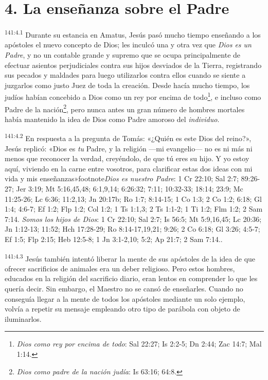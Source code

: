 \section*{4. La enseñanza sobre el Padre}
\par 
\textsuperscript{141:4.1} Durante su estancia en Amatus, Jesús pasó mucho tiempo enseñando a los apóstoles el nuevo concepto de Dios; les inculcó una y otra vez que \textit{Dios es un Padre}, y no un contable grande y supremo que se ocupa principalmente de efectuar asientos perjudiciales contra sus hijos desviados de la Tierra, registrando sus pecados y maldades para luego utilizarlos contra ellos cuando se siente a juzgarlos como justo Juez de toda la creación. Desde hacía mucho tiempo, los judíos habían concebido a Dios como un rey por encima de todo\footnote{\textit{Dios como rey por encima de todo}: Sal 22:27; Is 2:2-5; Dn 2:44; Zac 14:7; Mal 1:14.}, e incluso como Padre de la nación\footnote{\textit{Dios como padre de la nación judía}: Is 63:16; 64:8.}, pero nunca antes un gran número de hombres mortales había mantenido la idea de Dios como Padre amoroso del \textit{individuo}.

\par 
\textsuperscript{141:4.2} En respuesta a la pregunta de Tomás: «¿Quién es este Dios del reino?», Jesús replicó: «Dios es \textit{tu} Padre, y la religión ---mi evangelio--- no es ni más ni menos que reconocer la verdad, creyéndolo, de que tú eres su hijo. Y yo estoy aquí, viviendo en la carne entre vosotros, para clarificar estas dos ideas con mi vida y mis enseñanzas»footnote{\textit{Dios es nuestro Padre}: 1 Cr 22:10; Sal 2:7; 89:26-27; Jer 3:19; Mt 5:16,45,48; 6:1,9,14; 6:26:32; 7:11; 10:32-33; 18:14; 23:9; Mc 11:25-26; Lc 6:36; 11:2,13; Jn 20:17b; Ro 1:7; 8:14-15; 1 Co 1:3; 2 Co 1:2; 6:18; Gl 1:4; 4:6-7; Ef 1:2; Flp 1:2; Col 1:2; 1 Ts 1:1,3; 2 Ts 1:1-2; 1 Ti 1:2; Flm 1:2; 2 Sam 7:14. \textit{Somos los hijos de Dios}: 1 Cr 22:10; Sal 2:7; Is 56:5; Mt 5:9,16,45; Lc 20:36; Jn 1:12-13; 11:52; Hch 17:28-29; Ro 8:14-17,19,21; 9:26; 2 Co 6:18; Gl 3:26; 4:5-7; Ef 1:5; Flp 2:15; Heb 12:5-8; 1 Jn 3:1-2,10; 5:2; Ap 21:7; 2 Sam 7:14.}.

\par 
\textsuperscript{141:4.3} Jesús también intentó liberar la mente de sus apóstoles de la idea de que ofrecer sacrificios de animales era un deber religioso. Pero estos hombres, educados en la religión del sacrificio diario, eran lentos en comprender lo que les quería decir. Sin embargo, el Maestro no se cansó de enseñarles. Cuando no conseguía llegar a la mente de todos los apóstoles mediante un solo ejemplo, volvía a repetir su mensaje empleando otro tipo de parábola con objeto de iluminarlos.

